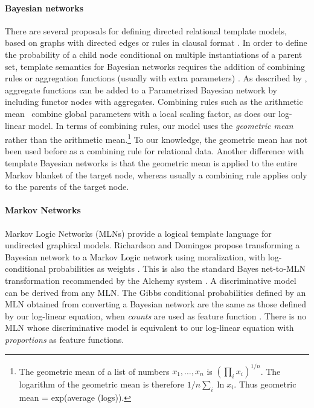\documentclass[runningheads,a4paper]{llncs}
\begin{document}
\paragraph{Bayesian networks} There are several proposals for defining directed relational template models, based on graphs with directed edges or rules in clausal format \cite{Kersting2007,Getoor2007c,Fierens2009,Milch2007}. In order to define the probability of a child node conditional on multiple instantiations of a parent set, template semantics for Bayesian networks requires the addition of combining rules \cite{Kersting2007} or aggregation functions (usually with extra parameters) \cite{Getoor2007c}. As described by \cite{Kersting2007}, aggregate functions can be added to a Parametrized Bayesian network by including functor nodes with aggregates. Combining rules such as the arithmetic mean~\cite{Natarajan2010} combine global parameters with a local scaling factor, as does our log-linear model. In terms of combining rules,  our model uses the {\em geometric mean} rather than the arithmetic mean.\footnote{The geometric mean of a list of numbers $x_{1},\ldots,x_{n}$ is $(\prod_{i} x_{i})^{1/n}$. The logarithm of the geometric mean is therefore $1/n \sum_{i} \ln x_{i}$. Thus geometric mean = exp(average (logs)).} To our knowledge, the geometric mean has not been used before as a combining rule for relational data.  Another difference with template Bayesian networks is that the geometric mean is applied to the entire Markov blanket of the target node, whereas usually a combining rule applies only to the parents of the target node. 

\paragraph{Markov Networks} Markov Logic Networks (MLNs) provide a logical template language for undirected graphical models. 
Richardson and Domingos propose transforming a Bayesian network to a Markov Logic network using moralization, with log-conditional probabilities as weights \cite{Domingos2007}. 
This is also the standard Bayes net-to-MLN transformation recommended by the Alchemy system \cite{bib:bayes-convert}. A discriminative model can be derived from any MLN.  The Gibbs conditional probabilities defined by an MLN obtained from converting a Bayesian network are the same as those defined by our log-linear equation, when {\em counts} are used as feature function \cite{Schulte2011}. There is no MLN whose discriminative model is equivalent to our log-linear equation with {\em proportions} as feature functions.  
 
\end{document}
